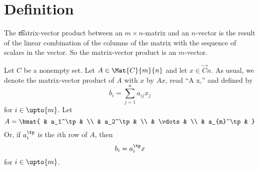 

\section*{Definition}

The \t{matrix-vector product} between an $m \times  n$-matrix and an $n$-vector is the result of the linear combination of the columns of the matrix with the sequence of scalars in the vector.
So the matrix-vector product is an $m$-vector.


Let $C$ be a nonempty set.
Let $A \in \Mat{C}{m}{n}$ and let $x \in \Vec{C}{n}$.
As usual, we denote the matrix-vector product of $A$ with $x$ by $Ax$, read ``A x,'' and defined by
\[
b_i = \sum_{j = 1}^{n} a_{ij}x_j
\]
for $i \in \upto{m}$.
Let
\[
A = \bmat{
& a_1^\tp & \\
& a_2^\tp & \\
& \vdots & \\
& a_{m}^\tp &
}
\]
Or, if $a_i^\tp$ is the $i$th row of $A$, then
\[
b_i = a_i^\tp x
\]
for $i \in \upto{m}$.

\blankpage
